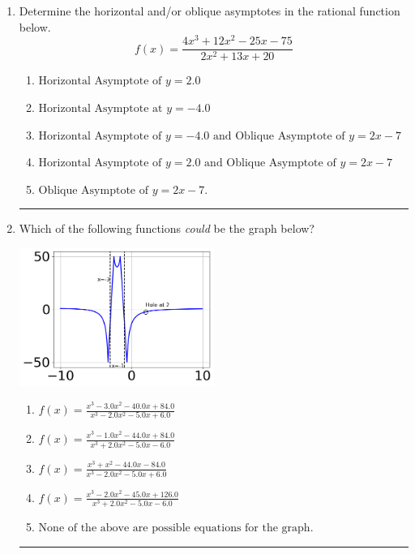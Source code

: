 \documentclass[14pt]{extbook}
\newcommand{\litem}[1]{\item#1\hspace*{-1cm}\rule{\textwidth}{0.4pt}}
\begin{document}
\begin{enumerate}
{\begin{enumerate}[label=\Alph*.]
\end{enumerate} }
\litem{
Determine the horizontal and/or oblique asymptotes in the rational function below.\[ f(x) = \frac{4x^{3} +12 x^{2} -25 x -75}{2x^{2} +13 x + 20} \]\begin{enumerate}[label=\Alph*.]
\item \( \text{Horizontal Asymptote of } y = 2.0  \)
\item \( \text{Horizontal Asymptote at } y = -4.0 \)
\item \( \text{Horizontal Asymptote of } y = -4.0 \text{ and Oblique Asymptote of } y = 2x -7 \)
\item \( \text{Horizontal Asymptote of } y = 2.0 \text{ and Oblique Asymptote of } y = 2x -7 \)
\item \( \text{Oblique Asymptote of } y = 2x -7. \)

\end{enumerate} }
\litem{
Which of the following functions \textit{could} be the graph below?
\begin{center}
    \includegraphics[width=0.5\textwidth]{../Figures/identifyGraphOfRationalFunctionB.png}
\end{center}
\begin{enumerate}[label=\Alph*.]
\item \( f(x)=\frac{x^{3} -3.0 x^{2} -40.0 x + 84.0}{x^{3} -2.0 x^{2} -5.0 x + 6.0} \)
\item \( f(x)=\frac{x^{3} -1.0 x^{2} -44.0 x + 84.0}{x^{3} +2.0 x^{2} -5.0 x -6.0} \)
\item \( f(x)=\frac{x^{3} + x^{2} -44.0 x -84.0}{x^{3} -2.0 x^{2} -5.0 x + 6.0} \)
\item \( f(x)=\frac{x^{3} -2.0 x^{2} -45.0 x + 126.0}{x^{3} +2.0 x^{2} -5.0 x -6.0} \)
\item \( \text{None of the above are possible equations for the graph.} \)


\end{enumerate}}
\end{enumerate}
\end{document}

